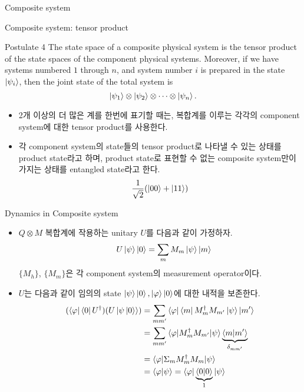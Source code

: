 \documentclass[9pt]{beamer}
\begin{document}
    \begin{section}{Composite system}
        \begin{frame}{Composite system: tensor product}
            \begin{block}{Postulate 4}
                The state space of a composite physical system is the tensor product of the state spaces of the component physical systems. Moreover, if we have systems numbered $1$ through $n$, and system number $i$ is prepared in the state $\ket{\psi_i}$, then the joint state of the total system is $$\ket{\psi_1} \otimes \ket{\psi_2} \otimes \cdots \otimes \ket{\psi_n}.$$
            \end{block}
            \begin{itemize}
                \item 2개 이상의 더 많은 계를 한번에 표기할 때는, 복합계를 이루는 각각의 component system에 대한 tensor product를 사용한다.
                \item 각 component system의 state들의 tensor product로 나타낼 수 있는 상태를 product state라고 하며, product state로 표현할 수 없는 composite system만이 가지는 상태를 \alert{entangled state}라고 한다. 
                $$ \frac{1}{ \sqrt 2} (\ket{00} + \ket{11})$$
            \end{itemize}
        \end{frame}

        \begin{frame}{Dynamics in Composite system}
            \begin{itemize}
                \item $Q\otimes M$ 복합계에 작용하는 unitary $U$를 다음과 같이 가정하자.
                $$ \quad U\ket{\psi}\ket{0} = \sum_m M_m\ket{\psi} \ket{m} $$
                $\{M_h\}$, $\{M_m\}$은 각 component system의 measurement operator이다. 
                \item $U$는 다음과 같이 임의의 state $\ket \psi\ket 0, \ket \varphi \ket 0$에 대한 내적을 보존한다.
                \begin{align*} 
                    (\bra \varphi \bra 0 U^\dagger)(U \ket{\psi \ket 0}) &= \sum_{mm'} \bra{\varphi } \bra {m}  M_{m}^\dagger M_{m'}\ket{\psi} \ket {m'}  \\ &= \sum_{ mm'} \braket{\varphi|M^\dagger_{m}M_{m'}|\psi} \underbrace{ \braket{m|m'}}_{\delta_{mm'}} \\
                    &= \braket{\varphi|\Sigma_m M_m^\dagger M_m|\psi} \\ &= {\braket
                    {\varphi|\psi}} = \bra \varphi \underbrace{\braket{0|0}}_1 \ket \psi
                \end{align*}
            \end{itemize}
        \end{frame}


\end{section}
\end{document}
